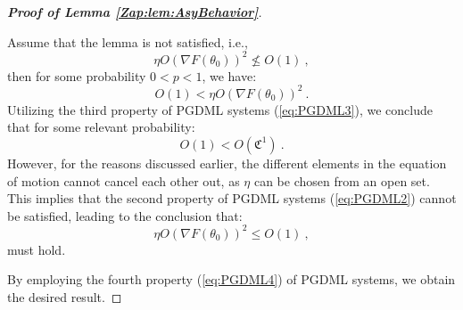 \documentclass{article} %
\begin{document}
\begin{proof}[\textbf{Proof of Lemma \ref{Zap:lem:AsyBehavior}}]
\

Assume that the lemma is not satisfied, i.e.,
\begin{equation}
\eta O\left(\nabla F\left(\theta_{0}\right)\right)^{2}\not\leq O\left(1\right) \ ,
\end{equation}
then for some probability \(0<p<1\), we have:
\begin{equation}
O\left(1\right)<\eta O\left(\nabla F\left(\theta_{0}\right)\right)^{2} \ .
\end{equation}
Utilizing the third property of PGDML systems (\ref{eq:PGDML3}), we conclude that for some relevant probability:
\begin{equation}
O\left(1\right)<O\left(\mathfrak{C}^{1}\right) \ .
\end{equation}
However, for the reasons discussed earlier, the different elements in the equation of motion cannot cancel each other out, as \(\eta\) can be chosen from an open set. This implies that the second property of PGDML systems (\ref{eq:PGDML2}) cannot be satisfied, leading to the conclusion that:
\begin{equation}
\eta O\left(\nabla F\left(\theta_{0}\right)\right)^{2}\leq O\left(1\right) \ ,
\end{equation}
must hold.

By employing the fourth property (\ref{eq:PGDML4}) of PGDML systems, we obtain the desired result.
\end{proof}
\end{document}
